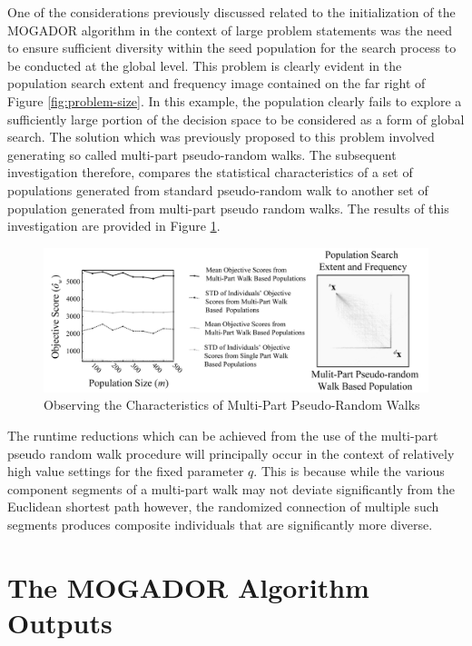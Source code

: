 One of the considerations previously discussed related to the initialization of the MOGADOR algorithm in the context of large problem statements was the need to ensure sufficient diversity within the seed population for the search process to be conducted at the global level. This problem is clearly evident in the population search extent and frequency image contained on the far right of Figure \ref{fig:problem-size}.  In this example, the population clearly fails to explore a sufficiently large portion of the decision space to be considered as a form of global search. The solution which was previously proposed to this problem involved generating so called multi-part pseudo-random walks. The subsequent investigation therefore, compares the statistical characteristics of a set of populations generated from standard pseudo-random walk to another set of population generated from multi-part pseudo random walks. The results of this investigation are provided in Figure \ref{fig:multi-part-walk-study}.
            
            \begin{figure}[!h]
            \centering
            \includegraphics[width=5.5in]{figures/multi-part-walk-study.png}
            \caption[Observing the Characteristics of Multi-Part Pseudo-Random Walks]{Observing the Characteristics of Multi-Part Pseudo-Random Walks}
            \label{fig:multi-part-walk-study}
            \end{figure}
            
The runtime reductions which can be achieved from the use of the multi-part pseudo random walk procedure will principally occur in the context of relatively high value settings for the fixed parameter $q$. This is because while the various component segments of a multi-part walk may not deviate significantly from the Euclidean shortest path however, the randomized connection of multiple such segments produces composite individuals that are significantly more diverse.
            
\section{The MOGADOR Algorithm Outputs}


